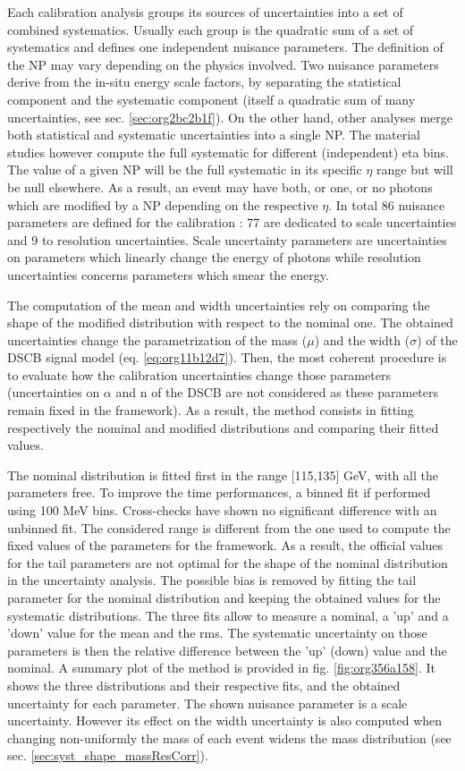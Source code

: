 \begin{enumerate}
Each calibration analysis groups its sources of uncertainties into a set of combined systematics.
Usually each group is the quadratic sum of a set of systematics and defines one independent nuisance parameters.
The definition of the NP may vary depending on the physics involved.
Two nuisance parameters derive from the in-situ energy scale factors, by separating the statistical component and the systematic component (itself a quadratic sum of many uncertainties, see sec. \ref{sec:org2bc2b1f}).
On the other hand, other analyses merge both statistical and systematic uncertainties into a single NP.
The material studies however compute the full systematic for different (independent) eta bins.
The value of a given NP will be the full systematic in its specific $\eta$ range but will be null elsewhere.
As a result, an event may have both, or one, or no photons which are modified by a NP depending on the respective $\eta$.
In total 86 nuisance parameters are defined for the calibration : 77 are dedicated to scale uncertainties and 9 to resolution uncertainties.
Scale uncertainty parameters are uncertainties on parameters which linearly change the energy of photons while resolution uncertainties concerns parameters which smear the energy.

The computation of the mean and width uncertainties rely on comparing the shape of the modified distribution with respect to the nominal one.
The obtained uncertainties change the parametrization of the mass ($\mu$) and the width ($\sigma$) of the DSCB signal model (eq. \ref{eq:org11b12d7}).
Then, the most coherent procedure is to evaluate how the calibration uncertainties change those parameters (uncertainties on $\alpha$ and n of the DSCB are not considered as these parameters remain fixed in the framework).
As a result, the method consists in fitting respectively the nominal and modified distributions and comparing their fitted values.

The nominal distribution is fitted first in the range [115,135] GeV, with all the parameters free.
To improve the time performances, a binned fit if performed using 100 MeV bins.
Cross-checks have shown no significant difference with an unbinned fit.
The considered range is different from the one used to compute the fixed values of the parameters for the framework.
As a result, the official values for the tail parameters are not optimal for the shape of the nominal distribution in the uncertainty analysis.
The possible bias is removed by fitting the tail parameter for the nominal distribution and keeping the obtained values for the systematic distributions.
The three fits allow to measure a nominal, a 'up' and a 'down' value for the mean and the rms.
The systematic uncertainty on those parameters is then the relative difference between the 'up' (down) value and the nominal.
A summary plot of the method is provided in fig. \ref{fig:org356a158}.
It shows the three distributions and their respective fits, and the obtained uncertainty for each parameter.
The shown nuisance parameter is a scale uncertainty.
However its effect on the width uncertainty is also computed when changing non-uniformly the mass of each event widens the mass distribution (see sec. \ref{sec:syst_shape_massResCorr}).



\end{enumerate}
